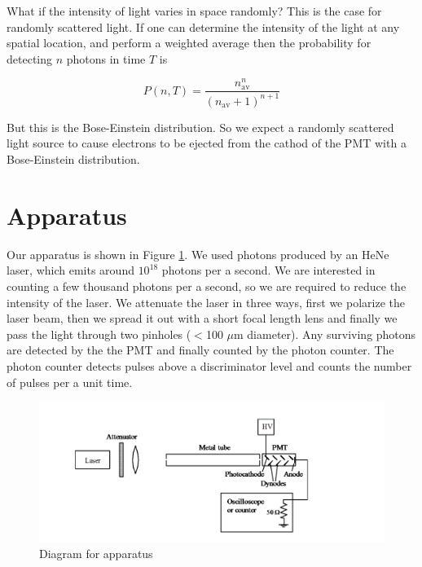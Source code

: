 What if the intensity of light varies in space randomly? This is the case for randomly scattered light. If one can determine the intensity of the light at any spatial location,  and perform a weighted average then the probability for detecting $n$ photons in time $T$ is

\begin{equation}
P(n,T) = \frac{n_{\mathrm{av}}^{n}}{(n_{\mathrm{av}}+1)^{n+1}}
\label{bose}
\end{equation}

But this is the Bose-Einstein distribution. So we expect a randomly scattered light source to cause electrons to be ejected from the cathod of the PMT with a Bose-Einstein distribution.

\section{Apparatus}
Our apparatus is shown in Figure \ref{apparatus}. We used photons produced by an HeNe laser, which emits around $10^{18}$ photons per a second. We are interested in counting a few thousand photons per a second, so we are required to reduce the intensity of the laser. We attenuate the laser in three ways, first we polarize the laser beam, then we spread it out with a short focal length lens and finally we pass the light through two pinholes ($<$100 $\mu$m diameter). Any surviving photons are detected by the the PMT and finally counted by the photon counter. The photon counter detects pulses above a discriminator level and counts the number of pulses per a unit time.
\begin{figure}[H]
  \includegraphics[totalheight=0.5\textwidth]{figs/apparatus}
  \caption{Diagram for apparatus}
  \label{apparatus}
\end{figure}

